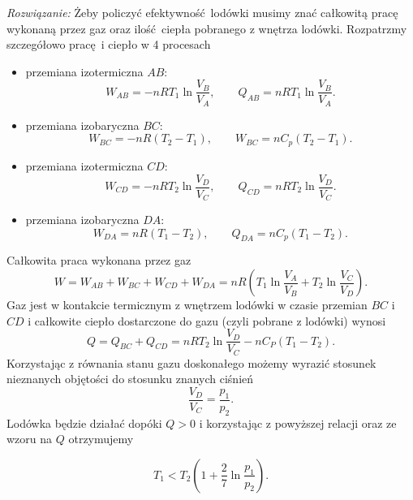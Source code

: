 \documentclass[11pt,a4paper]{article}
\begin{document}
 
{\em Rozwiązanie:}
Żeby policzyć efektywność lodówki musimy znać całkowitą pracę wykonaną przez gaz oraz ilość ciepła pobranego z wnętrza lodówki. Rozpatrzmy szczegółowo pracę i ciepło w 4 procesach
\begin{itemize}
 	\item przemiana izotermiczna $AB$:
	\begin{equation}
		W_{AB} = - n R T_1 \ln \frac{V_B}{V_A}, \qquad Q_{AB} = n R T_1 \ln \frac{V_B}{V_A}.
	\end{equation}
	\item przemiana izobaryczna $BC$:
	\begin{equation}
		W_{BC} = - n R (T_2 - T_1), \qquad W_{BC} = n C_p (T_2 - T_1).
	\end{equation}
	\item przemiana izotermiczna $CD$:
	\begin{equation}
		W_{CD} = - n R T_2 \ln \frac{V_D}{V_C}, \qquad Q_{CD} = n R T_2 \ln \frac{V_D}{V_C}.
	\end{equation}
	\item przemiana izobaryczna $DA$:
	\begin{equation}
		W_{DA} = n R (T_1 - T_2), \qquad Q_{DA} = n C_p (T_1 - T_2).
	\end{equation}
\end{itemize}
 Całkowita praca wykonana przez gaz
 \begin{equation}
 	W = W_{AB} + W_{BC} + W_{CD} + W_{DA} =  n R \left( T_1 \ln \frac{V_A}{V_B} + T_2 \ln \frac{V_C}{V_D} \right).
 \end{equation}
 Gaz jest w kontakcie termicznym z wnętrzem lodówki w czasie przemian $BC$ i $CD$ i całkowite ciepło dostarczone do gazu (czyli pobrane z lodówki) wynosi
 \begin{equation}
 	Q = Q_{BC} + Q_{CD} = n R T_2 \ln \frac{V_D}{V_C} - n C_P (T_1 - T_2).
 \end{equation}
 Korzystając z równania stanu gazu doskonałego możemy wyrazić stosunek nieznanych objętości do stosunku znanych ciśnień
 \begin{equation}
 	\frac{V_D}{V_C} = \frac{p_1}{p_2}.
 \end{equation}
 Lodówka będzie działać dopóki $Q>0$ i korzystając z powyższej relacji oraz ze wzoru na $Q$ otrzymujemy
 
 \begin{equation}
 	T_1 < T_2\left( 1 + \frac{2}{7}\ln \frac{p_1}{p_2} \right).
 \end{equation}
\end{document}
